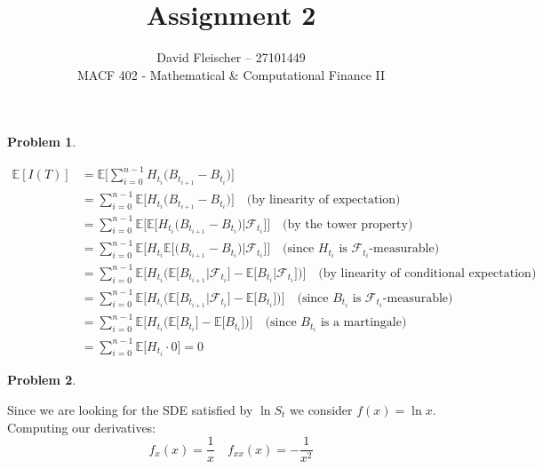 \documentclass[12pt]{article}
\newlength\tindent
\renewcommand{\indent}{\hspace*{\tindent}}
\begin{document}
 
 
\title{Assignment 2}
\author{David Fleischer -- 27101449\\ 
MACF 402 - Mathematical \& Computational Finance II}
 
\maketitle

{\bf Problem 1}.

\begin{align*}
	\mathbb E[I(T)] &= \mathbb E\Big[\sum^{n-1}_{i=0} H_{t_i}\big(B_{t_{i+1}} - B_{t_i}\big)\Big] \\
	&= \sum^{n-1}_{i=0} \mathbb E\Big[H_{t_i}\big(B_{t_{i+1}} - B_{t_i}\big)\Big] \quad \text{(by linearity of expectation)}\\
	&= \sum^{n-1}_{i=0} \mathbb E\Big[\mathbb E\big[ H_{t_i}\big(B_{t_{i+1}} - B_{t_i}\big)| \mathcal F_{t_i} \big]\Big] \quad \text{(by the tower property)} \\
	&= \sum^{n-1}_{i=0} \mathbb E\Big[H_{t_i} \mathbb E\big[\big(B_{t_{i+1}} - B_{t_i}\big)| \mathcal F_{t_i} \big]\Big] \quad \text{(since $H_{t_i}$ is $\mathcal F_{t_i}$-measurable)} \\
	&= \sum^{n-1}_{i=0} \mathbb E\Big[H_{t_i} \big(\mathbb E\big[B_{t_{i+1}} \big| \mathcal F_{t_i}\big] - \mathbb E\big[B_{t_i}\big| \mathcal F_{t_i} \big]\big)\Big]  \quad \text{(by linearity of conditional expectation)} \\
	&= \sum^{n-1}_{i=0} \mathbb E\Big[H_{t_i} \big(\mathbb E\big[B_{t_{i+1}} \big| \mathcal F_{t_i}\big] - \mathbb E\big[B_{t_i}\big]\big)\Big]  \quad \text{(since $B_{t_i}$ is $\mathcal F_{t_i}$-measurable)} \\
	&= \sum^{n-1}_{i=0} \mathbb E\Big[H_{t_i} \big(\mathbb E\big[B_{t_{i}}\big] - \mathbb E\big[B_{t_i}\big]\big)\Big]  \quad \text{(since $B_{t_i}$ is a martingale)} \\
	&= \sum^{n-1}_{i=0} \mathbb E\Big[H_{t_i} \cdot 0\Big] = 0
\end{align*}


{\bf Problem 2}.

\indent Since we are looking for the SDE satisfied by $\ln S_t$ we consider $f(x) = \ln x$. Computing our derivatives:
\begin{equation*}
	f_x(x) = \frac{1}{x} \quad f_{xx}(x) = -\frac{1}{x^2}
\end{equation*}
\end{document}
